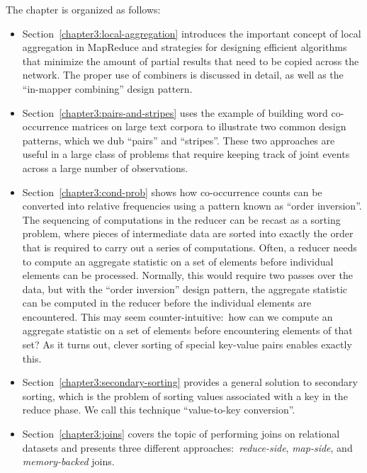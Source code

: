 The chapter is organized as follows:

\begin{itemize}

\item Section~\ref{chapter3:local-aggregation} introduces the
  important concept of local aggregation in MapReduce and strategies
  for designing efficient algorithms that minimize the amount of
  partial results that need to be copied across the network.  The
  proper use of combiners is discussed in detail, as well as the
  ``in-mapper combining'' design pattern.

\item Section~\ref{chapter3:pairs-and-stripes} uses the example of
  building word co-occurrence matrices on large text corpora to
  illustrate two common design patterns, which we dub ``pairs'' and
  ``stripes''.  These two approaches are useful in a large class of
  problems that require keeping track of joint events across a large
  number of observations.

\item Section~\ref{chapter3:cond-prob} shows how co-occurrence counts
  can be converted into relative frequencies using a pattern known as
  ``order inversion''.  The sequencing of computations in the reducer
  can be recast as a sorting problem, where pieces of intermediate
  data are sorted into exactly the order that is required to carry out
  a series of computations.  Often, a reducer needs to compute an
  aggregate statistic on a set of elements before individual elements
  can be processed.  Normally, this would require two passes over the
  data, but with the ``order inversion'' design pattern, the aggregate
  statistic can be computed in the reducer before the individual
  elements are encountered.  This may seem counter-intuitive:\ how can
  we compute an aggregate statistic on a set of elements before
  encountering elements of that set?  As it turns out, clever sorting
  of special key-value pairs enables exactly this.

\item Section~\ref{chapter3:secondary-sorting} provides a general
  solution to secondary sorting, which is the problem of sorting
  values associated with a key in the reduce phase.  We call this
  technique ``value-to-key conversion''.

\item Section~\ref{chapter3:joins} covers the topic of performing
  joins on relational datasets and presents three different
  approaches:\ {\it reduce-side}, {\it map-side}, and {\it
    memory-backed} joins.

\end{itemize}

